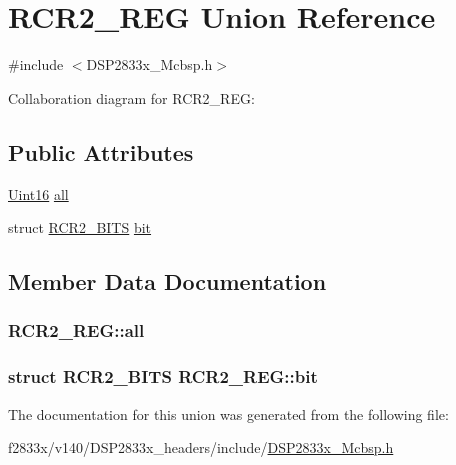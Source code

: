 \hypertarget{union_r_c_r2___r_e_g}{}\section{R\+C\+R2\+\_\+\+R\+E\+G Union Reference}
\label{union_r_c_r2___r_e_g}


{\ttfamily \#include $<$D\+S\+P2833x\+\_\+\+Mcbsp.\+h$>$}



Collaboration diagram for R\+C\+R2\+\_\+\+R\+E\+G\+:
\subsection*{Public Attributes}
\begin{DoxyCompactItemize}
\item 
\hyperlink{_d_s_p2833x___device_8h_a59a9f6be4562c327cbfb4f7e8e18f08b}{Uint16} \hyperlink{union_r_c_r2___r_e_g_a170efacde358a85089d1bf927abccf94}{all}
\item 
struct \hyperlink{struct_r_c_r2___b_i_t_s}{R\+C\+R2\+\_\+\+B\+I\+T\+S} \hyperlink{union_r_c_r2___r_e_g_ac5d2a813b16eb90f2ea735d890df9376}{bit}
\end{DoxyCompactItemize}


\subsection{Member Data Documentation}
\hypertarget{union_r_c_r2___r_e_g_a170efacde358a85089d1bf927abccf94}{}
\subsubsection[{all}]{ R\+C\+R2\+\_\+\+R\+E\+G\+::all}\label{union_r_c_r2___r_e_g_a170efacde358a85089d1bf927abccf94}
\hypertarget{union_r_c_r2___r_e_g_ac5d2a813b16eb90f2ea735d890df9376}{}
\subsubsection[{bit}]{\setlength{\rightskip}{0pt plus 5cm}struct {\bf R\+C\+R2\+\_\+\+B\+I\+T\+S} R\+C\+R2\+\_\+\+R\+E\+G\+::bit}\label{union_r_c_r2___r_e_g_ac5d2a813b16eb90f2ea735d890df9376}


The documentation for this union was generated from the following file\+:\begin{DoxyCompactItemize}
\item 
f2833x/v140/\+D\+S\+P2833x\+\_\+headers/include/\hyperlink{_d_s_p2833x___mcbsp_8h}{D\+S\+P2833x\+\_\+\+Mcbsp.\+h}\end{DoxyCompactItemize}

